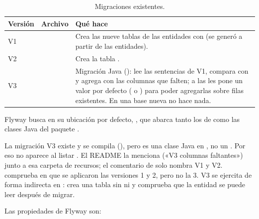 \begin{table}[H]
	\centering
	\caption{Migraciones existentes.}
	\label{tab:bd-migraciones}
	\begin{tabular}{L{1.4cm}L{5.6cm}L{6.7cm}}
		\hline
		\textbf{Versión} & \textbf{Archivo} & \textbf{Qué hace} \\ \hline
		V1 &   & Crea las nueve tablas de las
		entidades con  (se generó a partir de las entidades). \\
		V2 &   & Crea la tabla . \\
		V3 &   & Migración Java
		(): lee las sentencias  de V1, compara con 
		y agrega con  las columnas que falten; a las  les pone un
		valor por defecto ( o ) para poder agregarlas sobre filas existentes. En una base nueva no hace
		nada. \\ \hline
	\end{tabular}
\end{table}

Flyway busca en su ubicación por defecto, , que abarca tanto los  de
 como las clases Java del paquete .

\begin{nota}
La migración V3 existe y se compila (), pero es una
clase Java en , no un . Por eso no aparece al listar
. El README la menciona («V3 columnas faltantes») junto a esa carpeta de recursos;
el comentario de  solo nombra V1 y V2.  comprueba en
 que se aplicaron las versiones 1 y 2, pero no la 3. V3 se ejercita de forma indirecta en
: crea una tabla  sin  ni  y
comprueba que la entidad  se puede leer después de migrar.
\end{nota}

Las propiedades de Flyway son:

